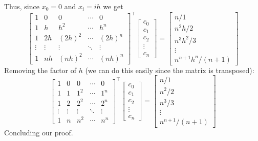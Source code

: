 \documentclass{book}
\begin{document}
Thus, since $x_0=0$ and $x_i = ih$ we get
\begin{equation}
    \begin{bmatrix}
        1&0&0&\cdots&0 \\
        1&h&h^2&\cdots&h^n \\
        1&2h&(2h)^2&\cdots&(2h)^n \\
        \vdots&\vdots & \vdots & \ddots & \vdots\\
        1&nh&(nh)^2&\cdots&(nh)^n
    \end{bmatrix}^\top
    \begin{bmatrix}
        c_0 \\
        c_1 \\
        c_2 \\
        \vdots \\
        c_n
    \end{bmatrix}
    =
    \begin{bmatrix}
        n/1\\
        n^2h/2\\
        n^3h^2/3\\
        \vdots \\
        n^{n+1}h^n/(n+1)
    \end{bmatrix} \nonumber
\end{equation}
Removing the factor of $h$ (we can do this easily since the matrix is transposed):
\begin{equation}
    \begin{bmatrix}
        1&0&0&\cdots&0 \\
        1&1&1^2&\cdots&1^n \\
        1&2&2^2&\cdots&2^n \\
        \vdots&\vdots & \vdots & \ddots & \vdots\\
        1&n&n^2&\cdots&n^n
    \end{bmatrix}^\top
    \begin{bmatrix}
        c_0 \\
        c_1 \\
        c_2 \\
        \vdots \\
        c_n
    \end{bmatrix}
    =
    \begin{bmatrix}
        n/1\\
        n^2/2\\
        n^3/3\\
        \vdots \\
        n^{n+1}/(n+1)
    \end{bmatrix} \nonumber
\end{equation}
Concluding our proof.
\end{document}
